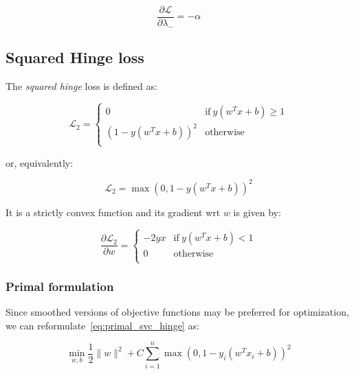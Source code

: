 \begin{equation} \label{eq:svc_bcqp_lagrangian_der_lm}
    \frac{\partial \mathcal{L}}{\partial \lambda_-}=-\alpha
\end{equation}

\pagebreak

\subsection{Squared Hinge loss}

The \emph{squared hinge} loss is defined as:

\begin{equation} \label{eq:squared_hinge_loss1}
	\mathcal{L}_2 = 
	\begin{cases}
		0 & \text{if} \ y (w^T x + b) \geq 1 \\
		(1 - y (w^T x + b))^2 & \text{otherwise} \\
	\end{cases}
\end{equation}

or, equivalently:

\begin{equation} \label{eq:squared_hinge_loss2}
	\mathcal{L}_2 = \max(0, 1 - y (w^T x + b))^2
\end{equation}

It is a strictly convex function and its gradient wrt $w$ is given by:

\begin{equation} \label{eq:squared_hinge_loss_der}
    \frac{\partial \mathcal{L}_2}{\partial w}=
        \begin{cases}
            - 2 y x & \text{if} \ y (w^T x + b) < 1 \\
            0 & \text{otherwise} \\ 
        \end{cases}
\end{equation}

\subsubsection{Primal formulation}

Since smoothed versions of objective functions may be preferred for optimization, we can reformulate~\eqref{eq:primal_svc_hinge} as:

\begin{equation} \label{eq:primal_svc_squared_hinge}
    \min_{w,b} \frac{1}{2} \| w \|^2 + C \sum_{i=1}^n \max(0, 1 - y_i (w^T x_i + b))^2
\end{equation}

